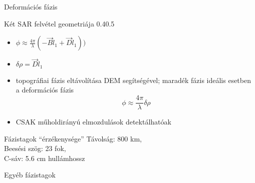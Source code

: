 \def\ft{Deformációs fázis}

\begin{frame}{\ft}
    \begin{figp}{}{Két SAR felvétel geometriája \cite{BurgmannInSAR}}{0.4}{0.5}
        \begin{itemize}
            \item $\phi \approx \frac{4\pi}{\lambda} (- \vec{B}\hat{l}_1 + \vec{D}\hat{l}_1))$
            \item $\delta\rho = \vec{D}\hat{l}_1$
            \item topográfiai fázis eltávolítása DEM segítségével; maradék fázis ideális esetben a deformációs fázis $$\phi \approx \frac{4\pi}{\lambda}\delta\rho$$
            \item CSAK műholdirányú elmozdulások detektálhatóak
        \end{itemize}
    \end{figp}
\end{frame}


\begin{frame}{Fázistagok ``érzékenysége''}
    Távolság: 800 km, \\
    Beesési szög: 23 fok, \\
    C-sáv: 5.6 cm hullámhossz
    
    \begin{center}
    \begin{minipage}[b]{0.45\textwidth}
        \centering
        
    \end{minipage}
    \hspace{10pt}
    \begin{minipage}[b]{0.45\textwidth}
        \centering
        
    \end{minipage}
    \end{center}
\end{frame}


\def\ft{Egyéb fázistagok}

\begin{frame}{\ft}
    \begin{minic}{0.75}
    \end{minic}
\end{frame}

